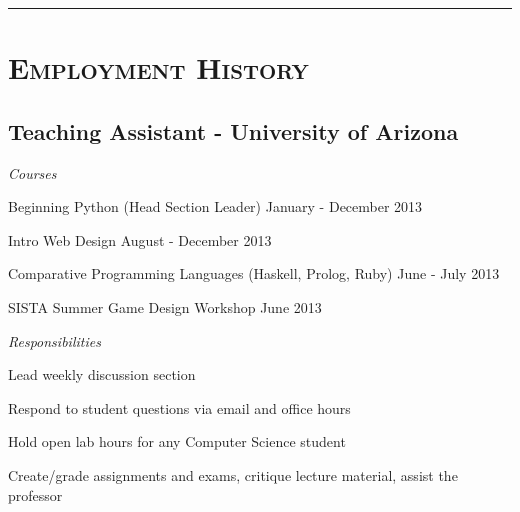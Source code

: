 \documentclass[11pt,letterpaper]{article}
\newcommand{\Hsep}{\vspace{4mm} \hrule \vspace{-1mm}}
\begin{document}
\begin{minipage}{\textwidth}
\begin{itemize}
\end{itemize}

\Hsep

\section{\scshape Employment History}

\subsection{Teaching Assistant - {\small University of Arizona}}

\begin{adjustwidth}{2em}{0pt}
{\large \emph{Courses}}

\hspace{1cm}Beginning Python {\small (Head Section Leader)} \hfill January - December 2013

\hspace{1cm}Intro Web Design \hfill August - December 2013

\hspace{1cm}Comparative Programming Languages {\small (Haskell, Prolog, Ruby)} \hfill June - July 2013

\hspace{1cm}SISTA Summer Game Design Workshop \hfill June 2013

\vspace{4mm}
{\large \emph {Responsibilities}}

\hspace{1cm}Lead weekly discussion section

\hspace{1cm}Respond to student questions via email and office hours

\hspace{1cm}Hold open lab hours for any Computer Science student

\hspace{1cm}Create/grade assignments and exams, critique lecture material, assist the professor
\end{adjustwidth}

\end{minipage}
\end{document}
